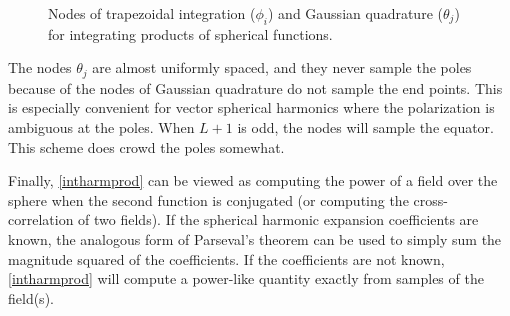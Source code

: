  \begin{figure}[H] 
   \centering
   \caption{Nodes of trapezoidal integration ($\phi_i$) and Gaussian quadrature ($\theta_j$) for integrating products of spherical functions.}
   \label{}
\end{figure}



The nodes $\theta_j$ are almost uniformly spaced, and they never sample the poles because of the nodes of Gaussian quadrature do not sample the end points. This is especially convenient for vector spherical harmonics where the polarization is ambiguous at the poles. When $L+1$ is odd, the nodes will sample the equator. This scheme does crowd the poles somewhat.

Finally, \eqref{intharmprod} can be viewed as computing the power of a field over the sphere when the second function is conjugated (or computing the cross-correlation of two fields). If the spherical harmonic expansion coefficients are known, the analogous form of Parseval's theorem can be used to simply sum the magnitude squared of the coefficients. If the coefficients are not known, \eqref{intharmprod} will compute a power-like quantity exactly from samples of the field(s). 



